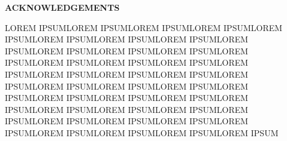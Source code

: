 {}
\begin{center}
    \large{\bf ACKNOWLEDGEMENTS}
\end{center}

LOREM IPSUMLOREM IPSUMLOREM IPSUMLOREM IPSUMLOREM IPSUMLOREM IPSUMLOREM IPSUMLOREM IPSUMLOREM IPSUMLOREM IPSUMLOREM IPSUMLOREM IPSUMLOREM IPSUMLOREM IPSUMLOREM IPSUMLOREM IPSUMLOREM IPSUMLOREM IPSUMLOREM IPSUMLOREM IPSUMLOREM IPSUMLOREM IPSUMLOREM IPSUMLOREM IPSUMLOREM IPSUMLOREM IPSUMLOREM IPSUMLOREM IPSUMLOREM IPSUMLOREM IPSUMLOREM IPSUMLOREM IPSUMLOREM IPSUMLOREM IPSUMLOREM IPSUMLOREM IPSUMLOREM IPSUMLOREM IPSUMLOREM IPSUMLOREM IPSUMLOREM IPSUM